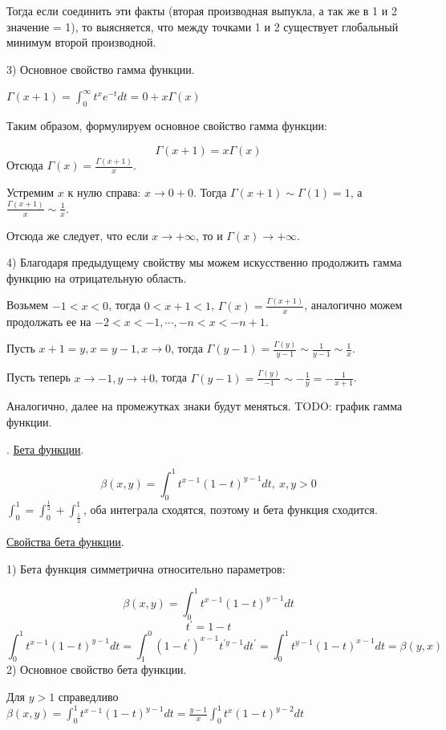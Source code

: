 \documentclass[12pt]{article}
\begin{document}
Тогда если соединить эти факты (вторая производная выпукла, а так же в 1 и 2 значение = 1), то выясняется, что между точками 1 и 2 существует глобальный минимум второй производной.\par
3) Основное свойство гамма функции.\par
$\Gamma(x+1) = \int_0^{\infty} t^{x} e^{-t} dt = 0 + x\Gamma(x)$\par
Таким образом, формулируем основное свойство гамма функции:\par
$$\Gamma (x+1) = x\Gamma(x)$$
Отсюда $\Gamma(x) = \frac{\Gamma(x+1)}{x}$.\par
Устремим $x$ к нулю справа: $x \to 0+0$. Тогда $\Gamma(x+1) \sim \Gamma(1) = 1$, а $\frac{\Gamma(x+1)}{x} \sim \frac{1}{x}$.\par
Отсюда же следует, что если $x \to +\infty$, то и $\Gamma(x) \to +\infty$.\par
4) Благодаря предыдущему свойству мы можем искусственно продолжить гамма функцию на отрицательную область.\par
Возьмем $-1 < x < 0$, тогда $0 < x +1 <1$, $\Gamma(x) = \frac{\Gamma(x+1)}{x} $, аналогично можем продолжать ее на $-2 < x < -1, \cdots, -n < x < -n + 1$.\par
Пусть $x + 1 = y, x = y - 1, x \to 0$, тогда $\Gamma(y-1) = \frac{\Gamma(y)}{y-1} \sim \frac{1}{y-1} \sim \frac{1}{x}$.\par
Пусть теперь $x \to -1, y \to +0$, тогда $\Gamma(y -1) = \frac{\Gamma(y)}{-1} \sim -\frac{1}{y} = -\frac{1}{x+1}$.\par
Аналогично, далее на промежутках знаки будут меняться. TODO: график гамма функции.\par
{}. \uline{Бета функции}.\par
$$\beta (x,y) = \int_0^1 t^{x-1} (1-t)^{y-1} dt, \ x,y>0$$
$\int_0^1 = \int_0^{\frac{1}{2}} + \int_{\frac{1}{2}}^1$, оба интеграла сходятся, поэтому и бета функция сходится.\par
\uline{Свойства бета функции}.\par
1) Бета функция симметрична относительно параметров:\par
$$\beta(x,y) = \int_0^1 t^{x-1} (1-t)^{y-1} dt$$
$$t^{'} = 1 -t$$
$$\int_0^1 t^{x-1} (1-t)^{y-1} dt = \int_1^0 (1-t^{'})^{x-1} t^{' y-1} dt^{'} = \int_0^1 t^{y-1} (1-t)^{x-1} dt = \beta(y,x)$$
2) Основное свойство бета функции.\par
Для $y>1$ справедливо $\beta(x,y) = \int_0^1 t^{x-1} (1-t)^{y-1} dt = \frac{y-1}{x} \int_0^1 t^{x} (1-t)^{y-2} dt$\par
\end{document}
